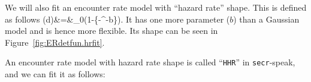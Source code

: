 {\small
\begin{knitrout}
\color{fgcolor}\begin{kframe}
\begin{alltt}
 \hlkwb{<-}  
                      \hlstd{=}\hlopt{~}\hlopt{~}\hlstd{),} \hlstd{=}\hlstd{)}
\end{alltt}
\end{kframe}
\end{knitrout}
}


We will also fit an encounter rate model with ``hazard rate'' shape. This is defined as follows
\be
\lambda(d)&=&\lambda_0\left(1-\exp\left\{-^{-b}\right\}\right).
\ee
\noindent 
It has one more parameter ($b$) than a Gaussian model and is hence more flexible. Its shape can be seen in Figure~\ref{fig:ERdetfun.hrfit}. 

An encounter rate model with hazard rate shape is called ``\texttt{HHR}'' in \texttt{secr}-speak, and we can fit it as follows:
{\small
\begin{knitrout}
\color{fgcolor}\begin{kframe}
\begin{alltt}
 \hlkwb{<-}  
                      \hlstd{=}\hlopt{~}\hlopt{~}\hlstd{),} \hlstd{=}\hlstd{)}
\end{alltt}
\end{kframe}
\end{knitrout}
}

